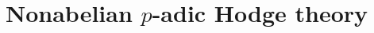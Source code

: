 \chapter{Nonabelian \texorpdfstring{$p$}{}-adic Hodge theory}
    \begin{abstract}
        
    \end{abstract}
    
    \minitoc
    
    
    
    
    
    